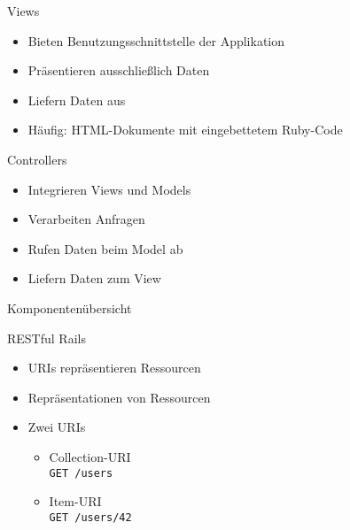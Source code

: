 \begin{frame}{Views}
  \begin{itemize}
    \item Bieten Benutzungsschnittstelle der Applikation
    \item Präsentieren ausschließlich Daten
    \item Liefern Daten aus
    \item Häufig: HTML-Dokumente mit eingebettetem Ruby-Code
  \end{itemize}
\end{frame}

\begin{frame}{Controllers}
  \begin{itemize}
    \item Integrieren Views und Models
    \item Verarbeiten Anfragen
    \item Rufen Daten beim Model ab
    \item Liefern Daten zum View
  \end{itemize}
\end{frame}

\begin{frame}{Komponentenübersicht}
  \begin{center}
    
  \end{center}
\end{frame}

\begin{frame}{RESTful Rails}
  \begin{itemize}
    \item URIs repräsentieren Ressourcen
    \item Repräsentationen von Ressourcen
    \item Zwei URIs
    \begin{itemize}
      \item Collection-URI \\ \lstinline|GET /users|
      \item Item-URI \\ \lstinline|GET /users/42|
    \end{itemize}
  \end{itemize}
\end{frame}


